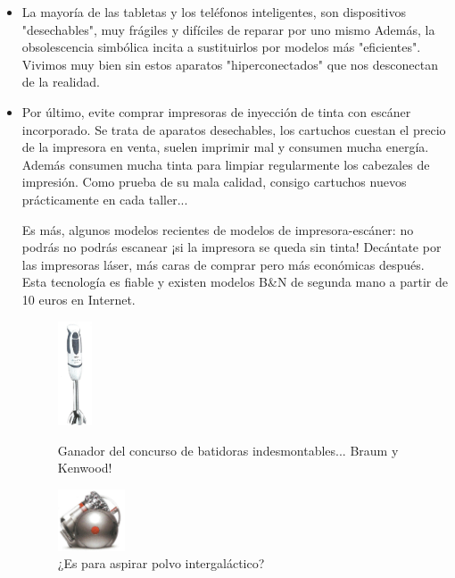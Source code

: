 \documentclass[a5paper,twoside,openany]{book}
\begin{document}
\begin{itemize}
\item La mayoría de las tabletas y los teléfonos inteligentes, son dispositivos "desechables", muy frágiles y difíciles de reparar por uno mismo Además, la obsolescencia simbólica incita a sustituirlos por modelos más "eficientes". Vivimos muy bien sin estos aparatos "hiperconectados" que nos desconectan de la realidad.

\item Por último, evite comprar impresoras de inyección de tinta con escáner incorporado. Se trata de aparatos desechables, los cartuchos cuestan el precio de la impresora en venta, suelen imprimir mal y consumen mucha energía. Además consumen mucha tinta para limpiar regularmente los cabezales de impresión. Como prueba de su mala calidad, consigo cartuchos nuevos prácticamente en cada taller...

Es más, algunos modelos recientes de modelos de impresora-escáner: no podrás no podrás escanear ¡si la impresora se queda sin tinta! Decántate por las impresoras láser, más caras de comprar pero más económicas después. Esta tecnología es fiable y existen modelos B\&N de segunda mano a partir de 10 euros en Internet.

\begin{figure}[h]
    \centering
    \begin{minipage}[b]{0.4\textwidth}
        \centering
        \includegraphics[width=1cm]{braum-mixer} %
        \caption*{Ganador del concurso de batidoras indesmontables... Braum y Kenwood!}
    \end{minipage}
    \hfill
    \begin{minipage}[b]{0.4\textwidth}
        \centering
        \includegraphics[width=2cm]{Dyson} %
        \caption*{¿Es para aspirar polvo intergaláctico?}
    \end{minipage}
\end{figure}



\end{itemize}
\end{document}
